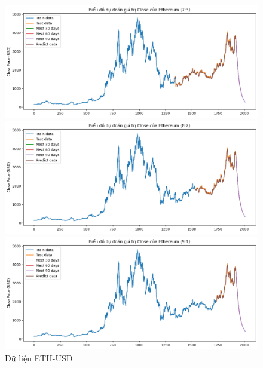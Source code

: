 \documentclass[conference]{IEEEtran}
\begin{document}
	\begin{figure}[H]
		\centering
		\begin{minipage}{0.15\textwidth}
			\centering
			\includegraphics[width=1\textwidth]{Figure/LN_ETH_73.png}
		\end{minipage}
		\hfill
		\begin{minipage}{0.15\textwidth}
			\centering
			\includegraphics[width=1\textwidth]{Figure/LN_ETH_82.png}
		\end{minipage}
		\hfill
		\begin{minipage}{0.15\textwidth}
			\centering
			\includegraphics[width=1\textwidth]{Figure/LN_ETH_91.png}
		\end{minipage}
		\caption{Dữ liệu ETH-USD}
		\label{fig:1}
	\end{figure}
	
\end{document}

